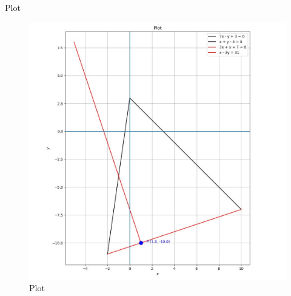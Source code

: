 \documentclass{beamer}
\begin{document}
\begin{frame}{Plot}
    \begin{figure}
        \centering
        \includegraphics[width=0.7\columnwidth]{../figs/plot_c.jpg}
        \caption{Plot}
        \label{fig:fig}
    \end{figure}
\end{frame}
\end{document}
